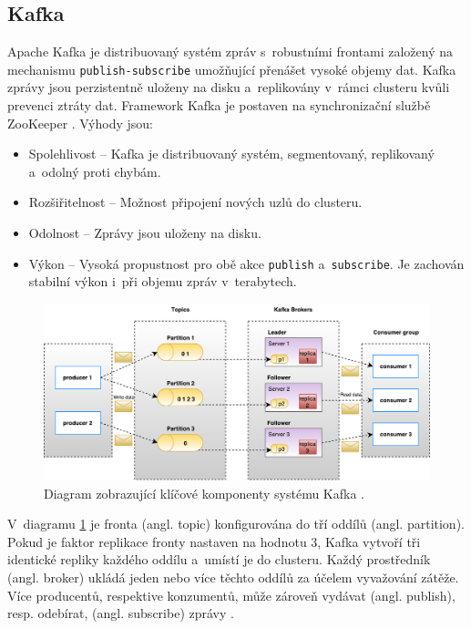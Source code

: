 \subsection{Kafka}
Apache Kafka je distribuovaný systém zpráv s~robustními frontami založený na mechanismu \texttt{publish-subscribe} umožňující přenášet vysoké objemy dat. Kafka zprávy jsou perzistentně uloženy na disku a~replikovány v~rámci clusteru kvůli prevenci ztráty dat. Framework Kafka je postaven na synchronizační službě ZooKeeper \cite{kafkaTutorialsPoint}. Výhody jsou:
\begin{itemize}
    \item Spolehlivost -- Kafka je distribuovaný systém, segmentovaný, replikovaný a~odolný proti chybám.
    
    \item Rozšiřitelnost -- Možnost připojení nových uzlů do clusteru.
    
    \item Odolnost -- Zprávy jsou uloženy na disku.
    
    \item Výkon -- Vysoká propustnost pro obě akce \texttt{publish} a~\texttt{subscribe}. Je zachován stabilní výkon i~při objemu zpráv v~terabytech.
\end{itemize}

\begin{figure}[!h]
  \centering
  \includegraphics[width=15cm]{template-fig/Kafka_architecture.pdf}
  \caption{Diagram zobrazující klíčové komponenty systému Kafka \cite{kafkaTutorialsPoint}.}
  \label{FIG_KafkaArchitecture}
\end{figure}

\noindent V~diagramu \ref{FIG_KafkaArchitecture} je fronta (angl. topic) konfigurována do tří oddílů (angl. partition). Pokud je faktor replikace fronty nastaven na hodnotu 3, Kafka vytvoří tři identické repliky každého oddílu a~umístí je do clusteru. Každý prostředník (angl. broker) ukládá jeden nebo více těchto oddílů za účelem vyvažování zátěže. Více producentů, respektive konzumentů, může zároveň vydávat (angl. publish), resp. odebírat, (angl. subscribe) zprávy \cite{kafkaTutorialsPoint}.

